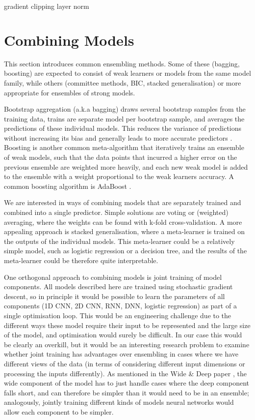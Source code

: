gradient clipping
layer norm

\section{Combining Models}
\label{bg_ensembling}

This section  introduces common ensembling methods.
Some of these (bagging, boosting)  are expected to consist of weak learners or models from the same model family, while others (committee methods, BIC, stacked generalisation) or more appropriate for ensembles of strong models.

Bootstrap aggregation (a.k.a bagging)   draws several bootstrap samples  from the training data,  trains are separate model per bootstrap sample,  and averages the predictions of these individual models.  This reduces the variance of predictions without increasing its bias and generally leads to  more accurate predictors \cite{bagging}.
Boosting is another common meta-algorithm that iteratively trains an ensemble of weak models, such that the data points that incurred a higher error on the previous ensemble are weighted more heavily, and each new weak model is added to the ensemble with a weight proportional to the weak learners accuracy.
A common boosting algorithm is AdaBoost \cite{adaboost}.

We are interested in ways of combining models that are separately trained and combined into a single predictor.
Simple solutions are voting or (weighted) averaging, where the weights can be found with k-fold cross-validation.
A more appealing approach is stacked generalisation, where a meta-learner is trained on the outputs of the individual models.
This meta-learner could be a relatively simple model, such as logistic regression or a decision tree, and the results of the meta-learner could be therefore quite interpretable.

One orthogonal approach to combining models is joint training of model components.
All models described here are trained using stochastic gradient descent, so in principle it would be possible to learn the parameters of all components (1D CNN, 2D CNN, RNN, DNN, logistic regression) as part of a single optimisation loop.
This would be an engineering challenge due to the different ways these model require their input to be represented and the large size of the model, and optimisation would surely be difficult.
In our case this would be clearly an overkill, but it would be an interesting research problem to examine whether joint training has advantages over ensembling in cases where we have different views of the data (in terms of considering different input dimensions or processing the inputs differently).
As mentioned in the Wide \& Deep paper \cite{wide_deep}, the wide component of the model has to just handle cases where the deep component falls short, and can therefore be simpler than it would need to be in an ensemble; analogously, jointly training different kinds of models neural networks would allow each component to be simpler.


